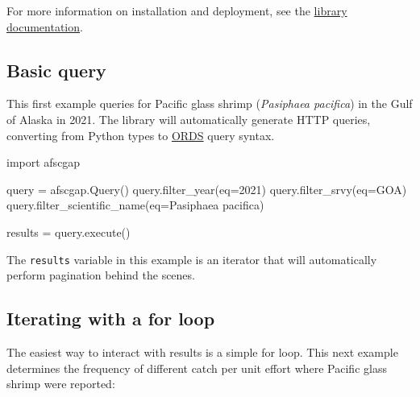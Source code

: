 \documentclass[
  letterpaper,
  oneside,
  open=any]{scrbook}
\newenvironment{Shaded}{\begin{snugshade}}{\end{snugshade}}
\newcommand{\AttributeTok}[1]{\textcolor[rgb]{0.40,0.45,0.13}{#1}}
\newcommand{\DecValTok}[1]{\textcolor[rgb]{0.68,0.00,0.00}{#1}}
\newcommand{\FunctionTok}[1]{\textcolor[rgb]{0.28,0.35,0.67}{#1}}
\newcommand{\NormalTok}[1]{\textcolor[rgb]{0.00,0.23,0.31}{#1}}
\newcommand{\OtherTok}[1]{\textcolor[rgb]{0.00,0.23,0.31}{#1}}
\newcommand{\StringTok}[1]{\textcolor[rgb]{0.13,0.47,0.30}{#1}}
\begin{document}
For more information on installation and deployment, see the
\href{https://pyafscgap.org}{library documentation}.

\subsection{Basic query}\label{basic-query}

This first example queries for Pacific glass shrimp (\emph{Pasiphaea
pacifica}) in the Gulf of Alaska in 2021. The library will automatically
generate HTTP queries, converting from Python types to
\href{https://www.oracle.com/database/technologies/appdev/rest.html}{ORDS}
query syntax.

\begin{Shaded}
\begin{Highlighting}[]
\NormalTok{import afscgap}

\NormalTok{query }\OtherTok{=} \FunctionTok{afscgap.Query}\NormalTok{()}
\FunctionTok{query.filter\_year}\NormalTok{(}\AttributeTok{eq=}\DecValTok{2021}\NormalTok{)}
\FunctionTok{query.filter\_srvy}\NormalTok{(}\AttributeTok{eq=}\StringTok{\textquotesingle{}GOA\textquotesingle{}}\NormalTok{)}
\FunctionTok{query.filter\_scientific\_name}\NormalTok{(}\AttributeTok{eq=}\StringTok{\textquotesingle{}Pasiphaea pacifica\textquotesingle{}}\NormalTok{)}

\NormalTok{results }\OtherTok{=} \FunctionTok{query.execute}\NormalTok{()}
\end{Highlighting}
\end{Shaded}

The \texttt{results} variable in this example is an iterator that will
automatically perform pagination behind the scenes.

\subsection{Iterating with a for loop}\label{iterating-with-a-for-loop}

The easiest way to interact with results is a simple for loop. This next
example determines the frequency of different catch per unit effort
where Pacific glass shrimp were reported:
\end{document}
